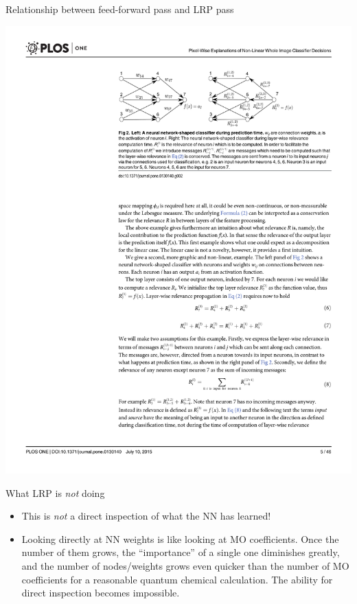 \documentclass[xetex,compress]{beamer}
\begin{document}
\begin{frame}{Relationship between feed-forward pass and LRP pass}
  \begin{center}
    \includegraphics[width=1.05\textwidth]{./figures/fig2_trimmed.pdf}
  \end{center}
\end{frame}

\begin{frame}{What LRP is \protect\emph{not} doing}
  \begin{itemize}
    \item This is \emph{not} a direct inspection of what the NN has learned!
    \item Looking directly at NN weights is like looking at MO coefficients. Once the number of them grows, the ``importance'' of a single one diminishes greatly, and the number of nodes/weights grows even quicker than the number of MO coefficients for a reasonable quantum chemical calculation. The ability for direct inspection becomes impossible.
  \end{itemize}
\end{frame}
\end{document}
